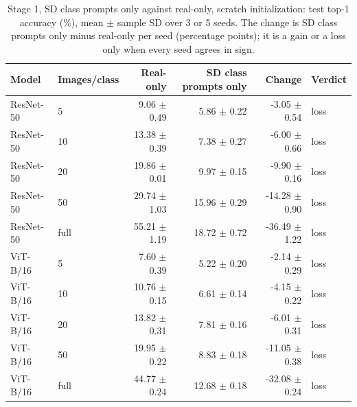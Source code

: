 \begin{table}[H]
\centering
\caption{Stage 1, SD class prompts only against real-only, scratch initialization: test top-1 accuracy (\%), mean $\pm$ sample SD over 3 or 5 seeds. The change is SD class prompts only minus real-only per seed (percentage points); it is a gain or a loss only when every seed agrees in sign.}
\label{tab:stage1-scratch-accuracy-sd_prompt_only-test}
\begin{tabular}{llrrrl}
\toprule
Model & Images/class & Real-only & SD class prompts only & Change & Verdict \\
\midrule
ResNet-50 & 5 & 9.06 $\pm$ 0.49 & 5.86 $\pm$ 0.22 & -3.05 $\pm$ 0.54 & loss \\
ResNet-50 & 10 & 13.38 $\pm$ 0.39 & 7.38 $\pm$ 0.27 & -6.00 $\pm$ 0.66 & loss \\
ResNet-50 & 20 & 19.86 $\pm$ 0.01 & 9.97 $\pm$ 0.15 & -9.90 $\pm$ 0.16 & loss \\
ResNet-50 & 50 & 29.74 $\pm$ 1.03 & 15.96 $\pm$ 0.29 & -14.28 $\pm$ 0.90 & loss \\
ResNet-50 & full & 55.21 $\pm$ 1.19 & 18.72 $\pm$ 0.72 & -36.49 $\pm$ 1.22 & loss \\
\midrule
ViT-B/16 & 5 & 7.60 $\pm$ 0.39 & 5.22 $\pm$ 0.20 & -2.14 $\pm$ 0.29 & loss \\
ViT-B/16 & 10 & 10.76 $\pm$ 0.15 & 6.61 $\pm$ 0.14 & -4.15 $\pm$ 0.22 & loss \\
ViT-B/16 & 20 & 13.82 $\pm$ 0.31 & 7.81 $\pm$ 0.16 & -6.01 $\pm$ 0.31 & loss \\
ViT-B/16 & 50 & 19.95 $\pm$ 0.22 & 8.83 $\pm$ 0.18 & -11.05 $\pm$ 0.38 & loss \\
ViT-B/16 & full & 44.77 $\pm$ 0.24 & 12.68 $\pm$ 0.18 & -32.08 $\pm$ 0.24 & loss \\
\bottomrule
\end{tabular}
\end{table}
